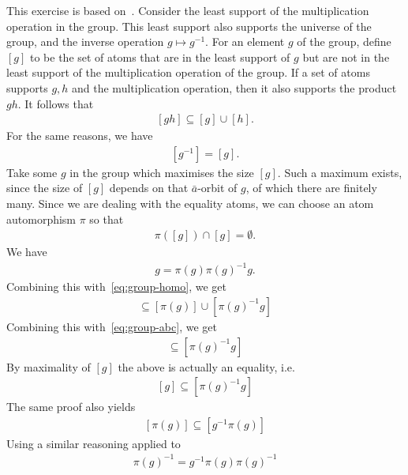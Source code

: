  { This exercise is based on~\cite[Lemma 2.14]{DBLP:journals/corr/ColcombetLP14}.
Consider the least support of the multiplication operation in the group. This least support also supports the universe of the group, and the inverse operation $g \mapsto g^{-1}$. For an element $g$ of the group, define $[g]$ to be the set of atoms that are in the least support of $g$ but are not in the least support of the multiplication operation of the group. 
If a set of atoms supports $g,h $ and the multiplication operation, then it also supports the product $gh$. It follows that 
\begin{align}\label{eq:group-homo}
 [g h] \subseteq [g] \cup [h] .
\end{align}
For the same reasons, we have
\begin{align}
 \label{eq:group-homo2}
 [g^{-1}] = [g] .
\end{align}
Take some $g$ in the group which maximises the size $[g]$. Such a maximum exists, since the size of $[g]$ depends on that $\bar a$-orbit of $g$, of which there are finitely many. Since we are dealing with the equality atoms, we can choose an atom automorphism $\pi$ so that 
\begin{align}\label{eq:group-abc}
 \pi([g]) \cap [g] = \emptyset.
\end{align}
 We have
\begin{align*}
 g = \pi(g) \pi(g)^{-1} g.
\end{align*}
Combining this with~\eqref{eq:group-homo}, we get 
\begin{align*}
 [g] \subseteq [\pi(g)] \cup [\pi(g)^{-1} g]
\end{align*}
Combining this with~\eqref{eq:group-abc}, we get
\begin{align*}
 [g] \subseteq [\pi(g)^{-1}g]
\end{align*}
By maximality of $[g]$ the above is actually an equality, i.e.
\begin{align}
 \label{eq:group-homo3}
 [g] \subseteq [\pi(g)^{-1}g]
\end{align}
The same proof also yields
\begin{align}
 \label{eq:group-homo4}
 [\pi(g)] \subseteq [g^{-1}\pi(g)]
\end{align}
 Using a similar reasoning applied to
\begin{align*}
 \pi(g)^{-1} = g^{-1} \pi(g) \pi(g)^{-1}

\end{align*}}
